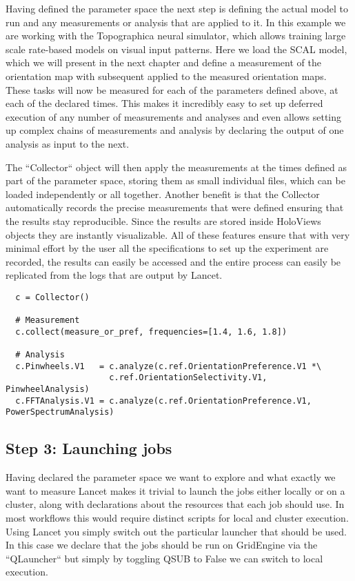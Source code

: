 Having defined the parameter space the next step is defining the
actual model to run and any measurements or analysis that are applied
to it. In this example we are working with the Topographica neural
simulator, which allows training large scale rate-based models on
visual input patterns. Here we load the SCAL model, which we will
present in the next chapter and define a measurement of the
orientation map with subsequent applied to the measured orientation
maps. These tasks will now be measured for each of the parameters
defined above, at each of the declared times. This makes it incredibly
easy to set up deferred execution of any number of measurements and
analyses and even allows setting up complex chains of measurements and
analysis by declaring the output of one analysis as input to the next.

The ``Collector`` object will then apply the measurements at the times
defined as part of the parameter space, storing them as small
individual files, which can be loaded independently or all
together. Another benefit is that the Collector automatically records
the precise measurements that were defined ensuring that the results
stay reproducible. Since the results are stored inside HoloViews
objects they are instantly visualizable. All of these features ensure
that with very minimal effort by the user all the specifications to
set up the experiment are recorded, the results can easily be accessed
and the entire process can easily be replicated from the logs that are
output by Lancet.


\begin{minipage}{\linewidth}
\begin{lstlisting}
  c = Collector()

  # Measurement
  c.collect(measure_or_pref, frequencies=[1.4, 1.6, 1.8])

  # Analysis
  c.Pinwheels.V1   = c.analyze(c.ref.OrientationPreference.V1 *\
                     c.ref.OrientationSelectivity.V1, PinwheelAnalysis)
  c.FFTAnalysis.V1 = c.analyze(c.ref.OrientationPreference.V1, PowerSpectrumAnalysis)
\end{lstlisting}
\end{minipage}

\subsection{Step 3: Launching jobs}

Having declared the parameter space we want to explore and what
exactly we want to measure Lancet makes it trivial to launch the jobs
either locally or on a cluster, along with declarations about the
resources that each job should use. In most workflows this would
require distinct scripts for local and cluster execution. Using Lancet
you simply switch out the particular launcher that should be used. In
this case we declare that the jobs should be run on GridEngine via the
``QLauncher`` but simply by toggling QSUB to False we can switch to
local execution.

